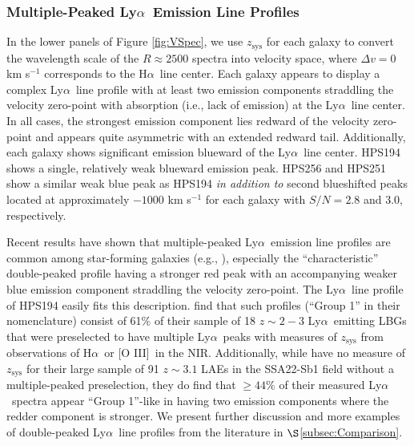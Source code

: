\documentclass{emulateapj}
\newcommand{\lya}{Ly$\alpha$}
\newcommand{\ha}{H$\alpha$}
\newcommand{\oiii}{[O III]}
\begin{document}
\subsubsection{Multiple-Peaked \lya\ Emission Line Profiles}\label{subsubsec:LyAnPeaks}
In the lower panels of Figure \ref{fig:VSpec}, we use $z_\mathrm{sys}$ for each galaxy to convert the wavelength scale of the $R\approx2500$ spectra into velocity space, where $\Delta v = 0$ km s$^{-1}$ corresponds to the \ha\ line center. Each galaxy appears to display a complex \lya\ line profile with at least two emission components straddling the velocity zero-point with absorption (i.e., lack of emission) at the \lya\ line center. In all cases, the strongest emission component lies redward of the velocity zero-point and appears quite asymmetric with an extended redward tail. Additionally, each galaxy shows significant emission blueward of the \lya\ line center. HPS194 shows a single, relatively weak blueward emission peak. HPS256 and HPS251 show a similar weak blue peak as HPS194 \textit{in addition to} second blueshifted peaks located at approximately $-1000$ km s$^{-1}$ for each galaxy with $S/N = 2.8$ and $3.0$, respectively.

Recent results have shown that multiple-peaked \lya\ emission line profiles are common among star-forming galaxies (e.g., \citealp{kulas2012,yamada2012}), especially the ``characteristic'' double-peaked profile having a stronger red peak with an accompanying weaker blue emission component straddling the velocity zero-point. The \lya\ line profile of HPS194 easily fits this description. \citet{kulas2012} find that such profiles (``Group 1'' in their nomenclature) consist of 61\% of their sample of 18 $z \sim 2-3$ \lya\ emitting LBGs that were preselected to have multiple \lya\ peaks with measures of $z_\mathrm{sys}$ from observations of \ha\ or \oiii\ in the NIR. Additionally, while \citet{yamada2012} have no measure of $z_{\mathrm{sys}}$ for their large sample of 91 $z\sim3.1$ LAEs in the SSA22-Sb1 field without a multiple-peaked preselection, they do find that $\geq44$\% of their measured \lya\ spectra appear ``Group 1''-like in having two emission components where the redder component is stronger. We present further discussion and more examples of double-peaked \lya\ line profiles from the literature in $\S$\ref{subsec:Comparison}. 
\end{document}
